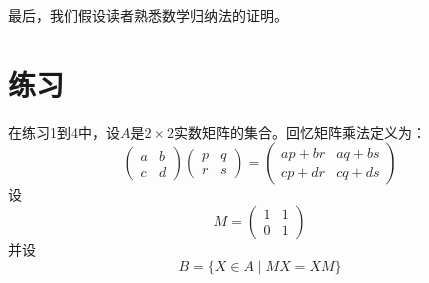 最后，我们假设读者熟悉数学归纳法的证明。

\section*{练习}

在练习1到4中，设$A$是$2 \times 2$实数矩阵的集合。回忆矩阵乘法定义为：
\[
\begin{pmatrix} a & b \\ c & d \end{pmatrix} \begin{pmatrix} p & q \\ r & s \end{pmatrix} = \begin{pmatrix} ap + br & aq + bs \\ cp + dr & cq + ds \end{pmatrix}
\]
设
\[
M = \begin{pmatrix} 1 & 1 \\ 0 & 1 \end{pmatrix}
\]
并设
\[
B = \{ X \in A \mid MX = XM \}
\]
